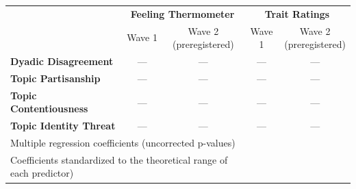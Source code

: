 \begin{tabular}{lcccc}
\hline
\multirow{2}{*}{~} & \multicolumn{2}{c}{\textbf{Feeling Thermometer}} & \multicolumn{2}{c}{\textbf{Trait Ratings}} \\
 & Wave 1 & \makecell{Wave 2 \\ (preregistered)} & Wave 1 & \makecell{Wave 2 \\ (preregistered)} \\
\hline

\textbf{Dyadic Disagreement} & — & — & — & — \\
\textbf{Topic Partisanship} & — & — & — & — \\
\textbf{Topic Contentiousness} & — & — & — & — \\
\textbf{Topic Identity Threat} & — & — & — & — \\
\hline

 \multicolumn{3}{l}{\footnotesize Multiple regression coefficients (uncorrected p-values)}\\
 \multicolumn{3}{l}{\footnotesize Coefficients standardized to the theoretical range of each predictor)}\\
 \hline
\end{tabular}
